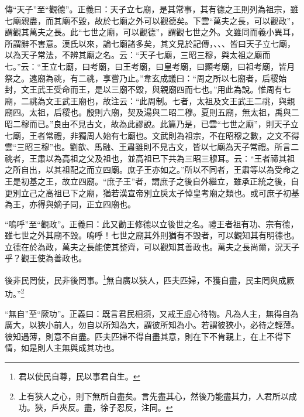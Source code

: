 {\noindent\zhuan{}\fzbyks 傳“天子”至“觀德”。正義曰：天子立七廟，是其常事，其有德之王則列為祖宗，雖七廟親盡，而其廟不毀，故於七廟之外可以觀德矣。下雲“萬夫之長，可以觀政”，謂觀其萬夫之長。此“七世之廟，可以觀德”，謂觀七世之外。文雖同而義小異耳，所謂辭不害意。漢氏以來，論七廟諸多矣，其文見於記傳，、、、皆曰天子立七廟，以為天子常法，不辨其廟之名。云：“天子七廟，三昭三穆，與太祖之廟而七。”云：“王立七廟，曰考廟，曰王考廟，曰皇考廟，曰顯考廟，曰祖考廟，皆月祭之。遠廟為祧，有二祧，享嘗乃止。”韋玄成議曰：“周之所以七廟者，后稷始封，文王武王受命而王，是以三廟不毀，與親廟四而七也。”用此為說。惟周有七廟，二祧為文王武王廟也，故注云：“此周制。七者，太祖及文王武王二祧，與親廟四。太祖，后稷也。殷則六廟，契及湯與二昭二穆。夏則五廟，無太祖，禹與二昭二穆而已。”良由不見古文，故為此謬說。此篇乃是，已雲“七世之廟”，則天子立七廟，王者常禮，非獨周人始有七廟也。文武則為祖宗，不在昭穆之數，之文不得雲“三昭三穆”也。劉歆、馬融、王肅雖則不見古文，皆以七廟為天子常禮。所言二祧者，王肅以為高祖之父及祖也，並高祖已下共為三昭三穆耳。云：“王者禘其祖之所自出，以其祖配之而立四廟。庶子王亦如之。”所以不同者，王肅等以為受命之王是初基之王，故立四廟。“庶子王”者，謂庶子之後自外繼立，雖承正統之後，自更別立己之高祖已下之廟，猶若漢宣帝別立戾太子悼皇考廟之類也。或可庶子初基為王，亦得與嫡子同，正立四廟也。 \par}

{\noindent\shu{}\fzkt “嗚呼”至“觀政”。正義曰：此又勸王修德以立後世之名。禮王者祖有功、宗有德，雖七世之外其廟不毀。嗚呼！七世之廟其外則猶有不毀者，可以觀知其有明德也。立德在於為政，萬夫之長能使其整齊，可以觀知其善政也。萬夫之長尚爾，況天子乎？觀王使為善政也。 \par}

後非民罔使，民非後罔事。\footnote{君以使民自尊，民以事君自生。}無自廣以狹人，匹夫匹婦，不獲自盡，民主罔與成厥功。”\footnote{上有狹人之心，則下無所自盡矣。言先盡其心，然後乃能盡其力，人君所以成功。狹，戶夾反。盡，徐子忍反，注同。}

{\noindent\shu{}\fzkt “無自”至“厥功”。正義曰：既言君民相須，又戒王虛心待物。凡為人主，無得自為廣大，以狹小前人，勿自以所知為大，謂彼所知為小。若謂彼狹小，必待之輕薄。彼知遇薄，則意不自盡。匹夫匹婦不得自盡其意，則在下不肯親上，在上不得下情，如是則人主無與成其功也。 \par}

